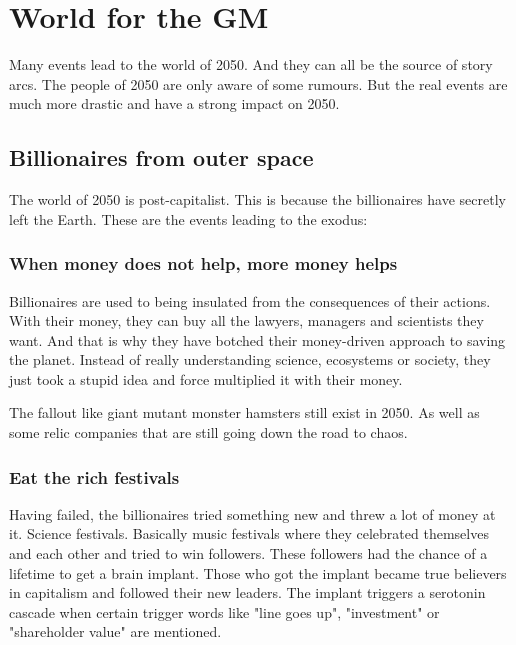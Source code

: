 \chapter{World for the GM}

Many events lead to the world of 2050. And they can all be the source of story arcs. The people of 2050 are only aware of some rumours. But the real events are much more drastic and have a strong impact on 2050.

\section{Billionaires from outer space}
\label{sec:Billionaires from outer space}

The world of 2050 is post-capitalist. This is because the billionaires have secretly left the Earth. These are the events leading to the exodus:

\subsection{When money does not help, more money helps}

Billionaires are used to being insulated from the consequences of their actions. With their money, they can buy all the lawyers, managers and scientists they want. And that is why they have botched their money-driven approach to saving the planet. Instead of really understanding science, ecosystems or society, they just took a stupid idea and force multiplied it with their money.

The fallout like giant mutant monster hamsters still exist in 2050. As well as some relic companies that are still going down the road to chaos.

\subsection{Eat the rich festivals}

Having failed, the billionaires tried something new and threw a lot of money at it. Science festivals. Basically music festivals where they celebrated themselves and each other and tried to win followers. These followers had the chance of a lifetime to get a brain implant.
Those who got the implant became true believers in capitalism and followed their new leaders. The implant triggers a serotonin cascade when certain trigger words like "line goes up", "investment" or "shareholder value" are mentioned.

